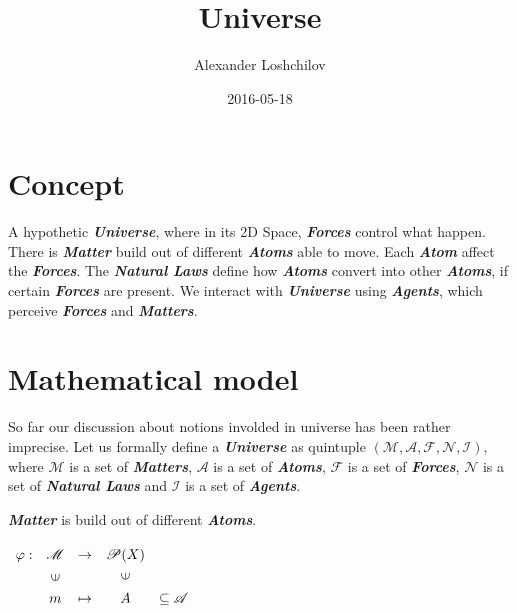 \documentclass[a4paper]{article}
\title{Universe}
\author{Alexander Loshchilov}
\date{2016-05-18}
\begin{document}
\maketitle



\newpage

\tableofcontents


\newpage

\section{Concept}

A hypothetic \textit{\textbf{Universe}}, where in its 2D Space, \textit{\textbf{Forces}} control what happen. There is \textit{\textbf{Matter}} build out of different \textit{\textbf{Atoms}} able to move. Each \textit{\textbf{Atom}} affect the \textit{\textbf{Forces}}. The \textit{\textbf{Natural Laws}} define how \textit{\textbf{Atoms}} convert into other \textit{\textbf{Atoms}}, if certain \textit{\textbf{Forces}} are present. We interact with \textit{\textbf{Universe}} using \textit{\textbf{Agents}}, which perceive \textit{\textbf{Forces}} and \textit{\textbf{Matters}}.

\newpage

\section{Mathematical model} 

So far our discussion about notions involded in universe has been rather imprecise.
Let us formally define a \textit{\textbf{Universe}} as quintuple
$ (\mathscr{M}, \mathscr{A}, \mathscr{F}, \mathscr{N}, \mathscr{I}) $,
where $ \mathscr{M} $ is a set of \textit{\textbf{Matters}}, $ \mathscr{A} $ is a set of \textit{\textbf{Atoms}},
$ \mathscr{F} $ is a set of \textit{\textbf{Forces}}, $ \mathscr{N} $ is a set of \textit{\textbf{Natural Laws}} and
$ \mathscr{I} $ is a set of \textit{\textbf{Agents}}.

\textit{\textbf{Matter}} is build out of different \textit{\textbf{Atoms}}.

$\renewcommand{\arraystretch}{1.3}
\begin{array}[c]{ccccc}
\varphi:&\mathscr{M}&\rightarrow&\mathscr{P}(X)\\
&\rotatebox[origin=c]{90}{{$\in$}}&&\rotatebox{90}{$\in$}&\\
&m&\mapsto& A &\subseteq \mathscr{A}
\end{array}$
\end{document}
